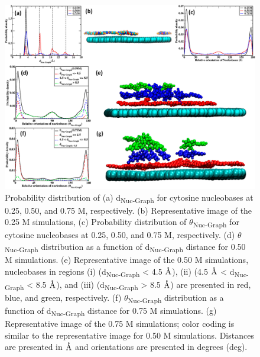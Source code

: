 \begin{figure}
    \centering
    \includegraphics[width=\textwidth]{Chapter2/Figures/Figure2.png}
    \caption[Probability distribution of d\textsubscript{Nuc-Graph} and $\theta$\textsubscript{Nuc-Graph} for cytosine nucleobases at 0.25, 0.50, and 0.75 M, respectively. Representative structures corresponding to identified features are also presented]{Probability distribution of (a) d\textsubscript{Nuc-Graph} for cytosine nucleobases at 0.25, 0.50, and 0.75 M, respectively. (b) Representative image of the 0.25 M simulations, (c) Probability distribution of $\theta$\textsubscript{Nuc-Graph} for cytosine nucleobases at 0.25, 0.50, and 0.75 M, respectively. (d) $\theta$\textsubscript{Nuc-Graph} distribution as a function of d\textsubscript{Nuc-Graph} distance for 0.50 M simulations. (e) Representative image of the 0.50 M simulations, nucleobases in regions (i) (d\textsubscript{Nuc-Graph} < 4.5 $\text{\normalfont\AA}$), (ii) (4.5 $\text{\normalfont\AA}$ < d\textsubscript{Nuc-Graph} < 8.5 $\text{\normalfont\AA}$), and (iii) (d\textsubscript{Nuc-Graph} > 8.5 $\text{\normalfont\AA}$) are presented in red, blue, and green, respectively. (f) $\theta$\textsubscript{Nuc-Graph} distribution as a function of d\textsubscript{Nuc-Graph} distance for 0.75 M simulations. (g) Representative image of the 0.75 M simulations; color coding is similar to the representative image for 0.50 M simulations. Distances are presented in $\text{\normalfont\AA}$ and orientations are presented in degrees (deg).}
\end{figure}
